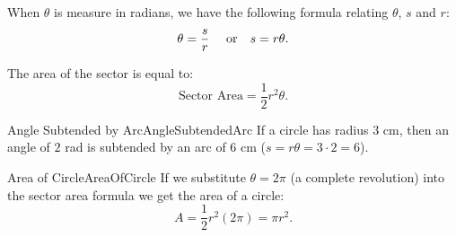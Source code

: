 When $\theta$ is measure in radians, we have the following 
formula relating $\theta$, $s$ and $r$:
$$\theta=\frac{s}{r}\mbox{\quad~or\quad}s=r\theta.$$

\begin{formulabox}
The area of the sector is equal to:
$$\mbox{Sector Area}=\frac{1}{2}r^2\theta.$$
\end{formulabox}

\begin{example}{Angle Subtended by Arc}{AngleSubtendedArc}
If a circle has radius $3$ cm, then an angle of $2$ rad is subtended 
by an arc of $6$ cm ($s=r\theta=3\cdot 2=6$).
\end{example}

\begin{example}{Area of Circle}{AreaOfCircle}
If we substitute $\theta=2\pi$ (a complete revolution) into the sector 
area formula we get the area of a circle: 
$$A=\frac{1}{2}r^2(2\pi)=\pi r^2.$$
\end{example}